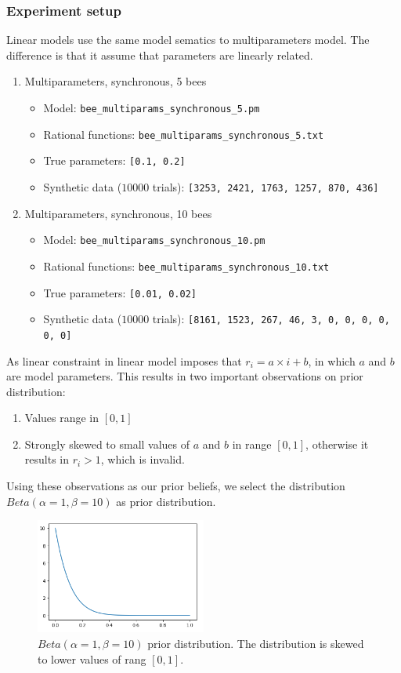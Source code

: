 \documentclass[12pt]{article}
\theoremstyle{definition}
\begin{document}
\subsubsection{Experiment setup}
Linear models use the same model sematics to multiparameters model. The
difference is that it assume that parameters are linearly related.
\begin{enumerate}
\item Multiparameters, synchronous, 5 bees
  \begin{itemize}
  \item Model: \texttt{bee\_multiparams\_synchronous\_5.pm}
  \item Rational functions: \texttt{bee\_multiparams\_synchronous\_5.txt}
  \item True parameters: \texttt{[0.1, 0.2]}
  \item Synthetic data ($10000$ trials): \texttt{[3253, 2421, 1763, 1257, 870, 436]}
  \end{itemize}
\item Multiparameters, synchronous, 10 bees
  \begin{itemize}
  \item Model: \texttt{bee\_multiparams\_synchronous\_10.pm}
  \item Rational functions: \texttt{bee\_multiparams\_synchronous\_10.txt}
  \item True parameters: \texttt{[0.01, 0.02]}
  \item Synthetic data ($10000$ trials): \texttt{[8161, 1523, 267, 46, 3, 0, 0, 0, 0, 0, 0]}
  \end{itemize}
\end{enumerate}

As linear constraint in linear model imposes that $r_i = a\times i + b$, in
which $a$ and $b$ are model parameters. This results in two important observations on
prior distribution:
\begin{enumerate}
\item Values range in $[0,1]$
\item Strongly skewed to small values of $a$ and $b$ in range $[0,1]$, otherwise it results in
  $r_i>1$, which is invalid.
\end{enumerate}
Using these observations as our prior beliefs, we select the distribution
$Beta(\alpha=1,\beta=10)$ as prior distribution.
\begin{figure}[H]
  \centering
  \includegraphics[width=0.5\textwidth,keepaspectratio]{figures/beta_1_10.png}
  \caption{$Beta(\alpha=1,\beta=10)$ prior distribution. The distribution is
    skewed to lower values of rang $[0,1]$.}
\end{figure}
\end{document}
